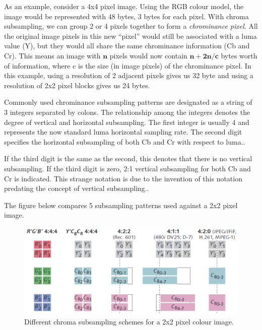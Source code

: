 As an example, consider a 4x4 pixel image. 
Using the RGB colour model, the image would be represented with 48 bytes, 3 bytes for each pixel. 
With chroma subsampling, we can group 2 or 4 pixels together to form a \emph{chrominance pixel}. 
All the original image pixels in this new ``pixel'' would still be associated with a luma value (Y), but 
they would all share the same chrominance information (Cb and Cr). 
This means an image with $\mathbf{n}$ pixels would 
now contain $\mathbf{n+2n/c}$ bytes worth of information, where 
c is the size (in image pixels) of the chrominance pixel. 
In this example, using a resolution of 2 adjacent pixels 
gives us 32 byte and using a resolution of 2x2 pixel blocks 
gives us 24 bytes.

Commonly used chrominance subsampling patterns are designated as 
a string of 3 integers separated by colons. 
The relationship among the integers denotes 
the degree of vertical and horizontal subsampling.
The first integer is usually 4 and represents the 
now standard luma horizontal sampling rate. 
The second digit specifies the horizontal subsampling of 
both Cb and Cr with respect to luma.\cite{poynton_chroma_subsampling}.

If the third digit is the same as the second,
this denotes that there is no vertical subsampling.
If the third digit is zero, 2:1 vertical subsampling
for both Cb and Cr is indicated. This strange notation
is due to the invention of this notation
predating the concept of vertical subsampling.\cite{poynton_chroma_subsampling}.

The figure below compares 5 subsampling patterns used against a 2x2 pixel image.

\begin{figure}[!hbtp]
\begin{center}
\includegraphics[scale=0.5]{figures/chromasub.png} 
\end{center}
\caption{Different chroma subsampling schemes for a 2x2 pixel colour image.\label{chroma_examples}\cite{poynton_chroma_subsampling}}
\end{figure}

